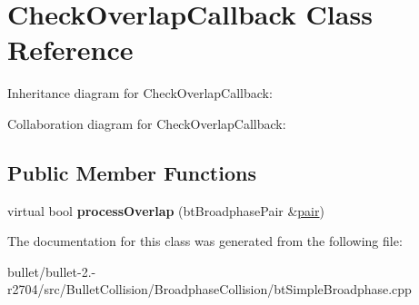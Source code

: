\hypertarget{class_check_overlap_callback}{\section{Check\+Overlap\+Callback Class Reference}
\label{class_check_overlap_callback}
}


Inheritance diagram for Check\+Overlap\+Callback\+:


Collaboration diagram for Check\+Overlap\+Callback\+:
\subsection*{Public Member Functions}
\begin{DoxyCompactItemize}
\item 
\hypertarget{class_check_overlap_callback_a6ad545232cda0d2eda94c5044fd983b2}{virtual bool {\bfseries process\+Overlap} (bt\+Broadphase\+Pair \&\hyperlink{structpair}{pair})}\label{class_check_overlap_callback_a6ad545232cda0d2eda94c5044fd983b2}

\end{DoxyCompactItemize}


The documentation for this class was generated from the following file\+:\begin{DoxyCompactItemize}
\item 
bullet/bullet-\/2.-\/r2704/src/\+Bullet\+Collision/\+Broadphase\+Collision/bt\+Simple\+Broadphase.\+cpp\end{DoxyCompactItemize}
